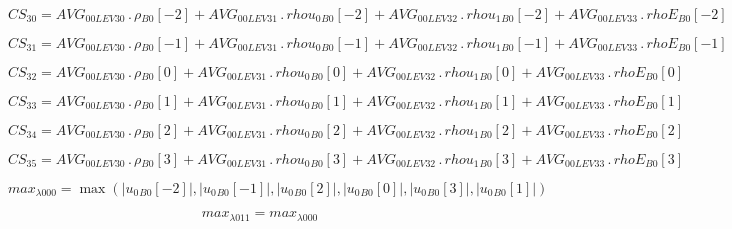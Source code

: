 \documentclass{article}
\begin{document}
\begin{dmath}CS_{30} = AVG_{0 0 LEV 30} \,.\, {\rho{_{B0}}}[{-2}] + AVG_{0 0 LEV 31} \,.\, {rhou_{0}{_{B0}}}[{-2}] + AVG_{0 0 LEV 32} \,.\, {rhou_{1}{_{B0}}}[{-2}] + AVG_{0 0 LEV 33} \,.\, {rhoE{_{B0}}}[{-2}]\end{dmath}

\begin{dmath}CS_{31} = AVG_{0 0 LEV 30} \,.\, {\rho{_{B0}}}[{-1}] + AVG_{0 0 LEV 31} \,.\, {rhou_{0}{_{B0}}}[{-1}] + AVG_{0 0 LEV 32} \,.\, {rhou_{1}{_{B0}}}[{-1}] + AVG_{0 0 LEV 33} \,.\, {rhoE{_{B0}}}[{-1}]\end{dmath}

\begin{dmath}CS_{32} = AVG_{0 0 LEV 30} \,.\, {\rho{_{B0}}}[{0}] + AVG_{0 0 LEV 31} \,.\, {rhou_{0}{_{B0}}}[{0}] + AVG_{0 0 LEV 32} \,.\, {rhou_{1}{_{B0}}}[{0}] + AVG_{0 0 LEV 33} \,.\, {rhoE{_{B0}}}[{0}]\end{dmath}

\begin{dmath}CS_{33} = AVG_{0 0 LEV 30} \,.\, {\rho{_{B0}}}[{1}] + AVG_{0 0 LEV 31} \,.\, {rhou_{0}{_{B0}}}[{1}] + AVG_{0 0 LEV 32} \,.\, {rhou_{1}{_{B0}}}[{1}] + AVG_{0 0 LEV 33} \,.\, {rhoE{_{B0}}}[{1}]\end{dmath}

\begin{dmath}CS_{34} = AVG_{0 0 LEV 30} \,.\, {\rho{_{B0}}}[{2}] + AVG_{0 0 LEV 31} \,.\, {rhou_{0}{_{B0}}}[{2}] + AVG_{0 0 LEV 32} \,.\, {rhou_{1}{_{B0}}}[{2}] + AVG_{0 0 LEV 33} \,.\, {rhoE{_{B0}}}[{2}]\end{dmath}

\begin{dmath}CS_{35} = AVG_{0 0 LEV 30} \,.\, {\rho{_{B0}}}[{3}] + AVG_{0 0 LEV 31} \,.\, {rhou_{0}{_{B0}}}[{3}] + AVG_{0 0 LEV 32} \,.\, {rhou_{1}{_{B0}}}[{3}] + AVG_{0 0 LEV 33} \,.\, {rhoE{_{B0}}}[{3}]\end{dmath}

\begin{dmath}max_{\lambda 0 00} = \max\left(\left|{{u_{0}{_{B0}}}[{-2}]}\right|, \left|{{u_{0}{_{B0}}}[{-1}]}\right|, \left|{{u_{0}{_{B0}}}[{2}]}\right|, \left|{{u_{0}{_{B0}}}[{0}]}\right|, \left|{{u_{0}{_{B0}}}[{3}]}\right|, 
\left|{{u_{0}{_{B0}}}[{1}]}\right|\right)\end{dmath}

\begin{dmath}max_{\lambda 0 11} = max_{\lambda 0 00}\end{dmath}
\end{document}
